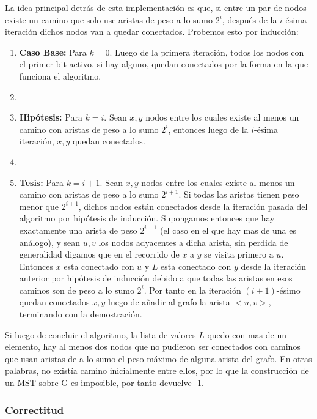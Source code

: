 \documentclass{article}
\begin{document}
La idea principal detrás de esta implementación es que, si entre un par de nodos existe un camino que solo use aristas de peso a lo sumo $2^i$, después de la $i$-ésima iteración dichos nodos van a quedar conectados. Probemos esto por inducción:

\begin{enumerate}
    \item \textbf{Caso Base:} Para $k = 0$. Luego de la primera iteración, todos los nodos con el primer bit activo, si hay alguno, quedan conectados por la forma en la que funciona el algoritmo.\item
    \item \textbf{Hipótesis:} Para $k = i$. Sean $x, y$ nodos entre los cuales existe al menos un camino con aristas de peso a lo sumo $2^i$, entonces luego de la $i$-ésima iteración, $x, y$ quedan conectados.\item
    \item \textbf{Tesis:} Para $k = i + 1$. Sean $x, y$ nodos entre los cuales existe al menos un camino con aristas de peso a lo sumo $2^{i + 1}$. Si todas las aristas tienen peso menor que $2^{i + 1}$, dichos nodos están conectados desde la iteración pasada del algoritmo por hipótesis de inducción. Supongamos entonces que hay exactamente una arista de peso $2^{i + 1}$ (el caso en el que hay mas de una es análogo), y sean $u, v$ los nodos adyacentes a dicha arista, sin perdida de generalidad digamos que en el recorrido de $x$ a $y$ se visita primero a $u$. Entonces $x$ esta conectado con $u$ y $L$ esta conectado con $y$ desde la iteración anterior por hipótesis de inducción debido a que todas las aristas en esos caminos son de peso a lo sumo $2^i$. Por tanto en la iteración $(i+1)$-ésimo quedan conectados $x, y$ luego de añadir al grafo la arista $<u, v>$, terminando con la demostración.

\end{enumerate}

Si luego de concluir el algoritmo, la lista de valores $L$ quedo con mas de un elemento, hay al menos dos nodos que no pudieron ser conectados con caminos que usan aristas de a lo sumo el peso máximo de alguna arista del grafo. En otras palabras, no existía camino inicialmente entre ellos, por lo que la construcción de un MST sobre G es imposible, por tanto devuelve -1.

\subsubsection{Correctitud}
\end{document}
